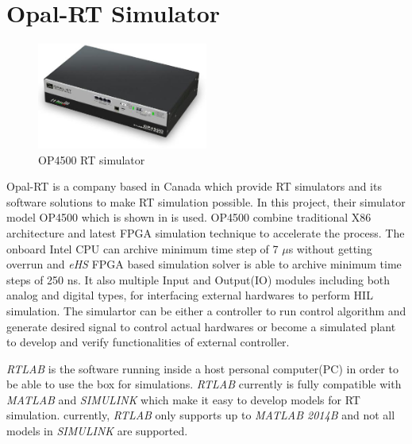 \section{Opal-RT Simulator}
\begin{figure}[b]
     \centering
     \includegraphics[width = 0.5\textwidth]{figures/op4500.jpg}
     \caption{OP4500 \gls{RT} simulator}
     \label{fig:op4500}
\end{figure}
Opal-RT is a company based in Canada which provide \gls{RT} simulators and its software solutions to make \gls{RT} simulation possible. In this project, their simulator model OP4500 which is shown in  is used. OP4500 combine traditional X86 architecture and latest \gls{FPGA} simulation technique to accelerate the process. The onboard Intel CPU can archive minimum time step of 7 $\mu
$s without getting overrun and \textit{eHS} \gls{FPGA} based simulation solver is able to archive minimum time steps of 250 ns. It also multiple Input and Output(IO) modules including both analog and digital types, for interfacing external hardwares to perform \gls{HIL} simulation. The simulartor can be either a controller to run control algorithm and generate desired signal to control actual hardwares or become a simulated plant to develop and verify functionalities of external controller. 

\textit{RTLAB} is the software running inside a host personal computer(PC) in order to be able to use the box for simulations. \textit{RTLAB} currently is fully compatible with \textit{MATLAB} and \textit{SIMULINK} which make it easy to develop models for \gls{RT} simulation. currently, \textit{RTLAB} only supports up to \textit{MATLAB 2014B} and not all models in \textit{SIMULINK} are supported. 


